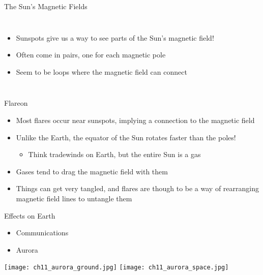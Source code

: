 \documentclass[pdf, aspectratio=169]{beamer}
\begin{document}
\begin{frame}{The Sun's Magnetic Fields}
  \begin{columns}
	\begin{itemize}
	  \item Sunspots give us a way to see parts of the Sun's magnetic field!
	  \item Often come in pairs, one for each magnetic pole
	  \item Seem to be loops where the magnetic field can connect
	\end{itemize}
	\begin{center}
	\end{center}
  \end{columns}
\end{frame}


\begin{frame}{Flareon}
  \begin{itemize}
	\item Most flares occur near sunspots, implying a connection to the magnetic field
	\item Unlike the Earth, the equator of the Sun rotates faster than the poles!
	  \begin{itemize}
		\item Think tradewinds on Earth, but the entire Sun is a gas
	  \end{itemize}
	\item Gases tend to drag the magnetic field with them
	\item Things can get very tangled, and flares are though to be a way of rearranging magnetic field lines to untangle them
  \end{itemize}
  \begin{center}
  \end{center}
\end{frame}

\begin{frame}{Effects on Earth}
  \begin{itemize}
	\item Communications
	\item Aurora
  \end{itemize}
  \begin{center}
	\texttt{[image: ch11\_aurora\_ground.jpg]}
	\texttt{[image: ch11\_aurora\_space.jpg]}
  \end{center}
\end{frame}

\end{document}
